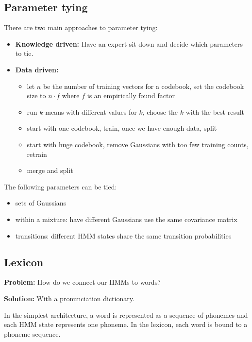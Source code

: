 \documentclass[11pt]{article}
\begin{document}
\subsection{Parameter tying}

There are two main approaches to parameter tying:
\begin{itemize}
    \item \textbf{Knowledge driven:} Have an expert sit down and decide which parameters to tie.
    \item \textbf{Data driven:}
        \begin{itemize}
            \item let $n$ be the number of training vectors for a codebook, set the codebook size to $n \cdot f$ where $f$ is an empirically found factor
            \item run $k$-means with different values for $k$, choose the $k$ with the best result
            \item start with one codebook, train, once we have enough data, split
            \item start with huge codebook, remove Gaussians with too few training counts, retrain
            \item merge and split
        \end{itemize}
\end{itemize}

The following parameters can be tied:
\begin{itemize}
    \item sets of Gaussians
    \item within a mixture: have different Gaussians use the same covariance matrix
    \item transitions: different HMM states share the same transition probabilities
\end{itemize}

\subsection{Lexicon}

\textbf{Problem:} How do we connect our HMMs to words?

\vspace{5pt}

\textbf{Solution:} With a pronunciation dictionary.

\vspace{10pt}

In the simplest architecture, a word is represented as a sequence of phonemes and each HMM state represents one phoneme. In the lexicon, each word is bound to a phoneme sequence.
\end{document}
